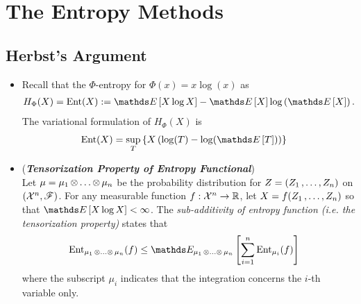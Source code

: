 \documentclass[11pt]{article}
\begin{document}
\section{The Entropy Methods}
\subsection{Herbst's Argument}
\begin{itemize}
\item \begin{remark} 
Recall that the $\Phi$-entropy for $\Phi(x) = x\log(x)$ as
\begin{align*}
H_{\Phi}(X) = \text{Ent}(X)&:=  \E{}{X\log X} - \E{}{X}\log\paren{\E{}{X}}. 
\end{align*}
The variational formulation of $H_{\Phi}(X)$ is
\begin{align*}
\text{Ent}(X)&= \sup_{T}\set{X\paren{\log(T) - \log(\E{}{T})}}
\end{align*}
\end{remark}

\item \begin{remark} (\textbf{\emph{Tensorization Property of Entropy Functional}})\\
Let $\mu = \mu_1 \,{\otimes}\ldots{\otimes}\, \mu_n$ be the probability distribution for $Z = (Z_1 \,{,}\ldots{,}\, Z_n)$ on $({\mathcal X}^n, {\mathscr F})$. For any measurable function $f: {\mathcal X}^n \to {\mathbb R}$, let $X = f(Z_1 \,{,}\ldots{,}\, Z_n)$ so that $\E{}{X\log X} < \infty$.  The \emph{sub-additivity of entropy function (i.e. the tensorization property)} states that 
\begin{align*}
\text{Ent}_{\mu_1 \xdotx{\otimes} \mu_n}(f) &\le \E{\mu_1 \xdotx{\otimes} \mu_n}{\sum_{i=1}^{n}\text{Ent}_{\mu_i}(f)}
\end{align*} where the subscript $\mu_i$ indicates that the integration concerns the $i$-th variable only.
\end{remark}


\end{itemize}
\end{document}
